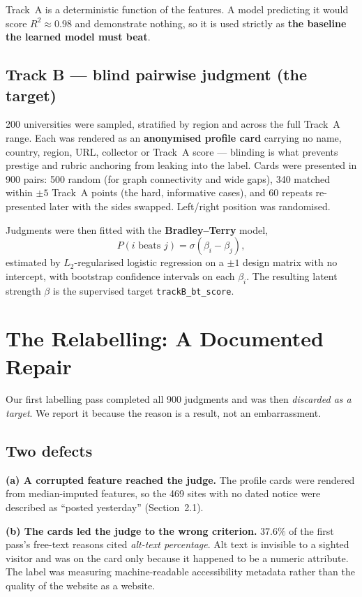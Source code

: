 \documentclass[11pt,a4paper]{article}
\begin{document}
Track~A is a deterministic function of the features. A model predicting it would score
$R^2 \approx 0.98$ and demonstrate nothing, so it is used strictly as \textbf{the baseline the
learned model must beat}.

\subsection{Track B --- blind pairwise judgment (the target)}

200 universities were sampled, stratified by region and across the full Track~A range. Each
was rendered as an \textbf{anonymised profile card} carrying no name, country, region, URL,
collector or Track~A score --- blinding is what prevents prestige and rubric anchoring from
leaking into the label. Cards were presented in 900 pairs: 500 random (for graph connectivity
and wide gaps), 340 matched within $\pm 5$ Track~A points (the hard, informative cases), and
60 repeats re-presented later with the sides swapped. Left/right position was randomised.

Judgments were then fitted with the \textbf{Bradley--Terry} model,
\[
P(i \text{ beats } j) = \sigma(\beta_i - \beta_j),
\]
estimated by $L_2$-regularised logistic regression on a $\pm 1$ design matrix with no
intercept, with bootstrap confidence intervals on each $\beta_i$. The resulting latent
strength $\beta$ is the supervised target \texttt{trackB\_bt\_score}.

\section{The Relabelling: A Documented Repair}

Our first labelling pass completed all 900 judgments and was then \emph{discarded as a
target}. We report it because the reason is a result, not an embarrassment.

\subsection{Two defects}

\textbf{(a) A corrupted feature reached the judge.} The profile cards were rendered from
median-imputed features, so the 469 sites with no dated notice were described as ``posted
yesterday'' (Section~2.1).

\textbf{(b) The cards led the judge to the wrong criterion.} $37.6\%$ of the first pass's
free-text reasons cited \emph{alt-text percentage}. Alt text is invisible to a sighted visitor
and was on the card only because it happened to be a numeric attribute. The label was
measuring machine-readable accessibility metadata rather than the quality of the website as a
website.
\end{document}

